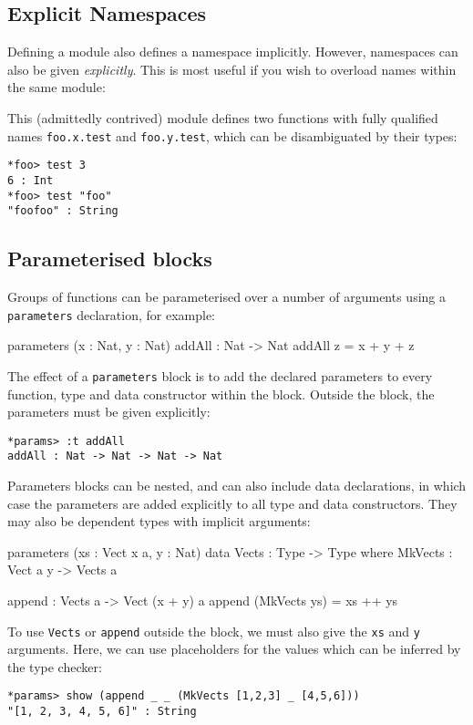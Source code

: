 \subsection{Explicit Namespaces}

Defining a module also defines a namespace implicitly.
However, namespaces can also be given \emph{explicitly}.
This is most useful if you wish to overload names within the same module:


\noindent
This (admittedly contrived) module defines two functions with fully qualified names
\texttt{foo.x.test} and \texttt{foo.y.test}, which can be disambiguated by their types:

\begin{lstlisting}[style=stdout]
*foo> test 3 
6 : Int
*foo> test "foo" 
"foofoo" : String
\end{lstlisting}

\subsection{Parameterised blocks}

Groups of functions can be parameterised over a number of arguments using a \texttt{parameters} declaration, for example:

\begin{code}
parameters (x : Nat, y : Nat)
    addAll : Nat -> Nat
    addAll z = x + y + z
\end{code}

\noindent
The effect of a \texttt{parameters} block is to add the declared parameters to every function, type and data constructor within the block.
Outside the block, the parameters must be given explicitly:

\begin{lstlisting}[style=stdout]
*params> :t addAll
addAll : Nat -> Nat -> Nat -> Nat
\end{lstlisting}

\noindent
Parameters blocks can be nested, and can also include data declarations, in which case the parameters are added explicitly to all type and data constructors.
They may also be dependent types with implicit arguments:

\begin{code}
parameters (xs : Vect x a, y : Nat)
    data Vects : Type -> Type where
         MkVects : Vect a y -> Vects a
  
    append : Vects a -> Vect (x + y) a
    append (MkVects ys) = xs ++ ys
\end{code}

\noindent
To use \texttt{Vects} or \texttt{append} outside the block, we must also give the \texttt{xs} and \texttt{y} arguments.
Here, we can use placeholders for the values which can be inferred by the type checker:

\begin{lstlisting}[style=stdout]
*params> show (append _ _ (MkVects [1,2,3] _ [4,5,6]))
"[1, 2, 3, 4, 5, 6]" : String
\end{lstlisting}

